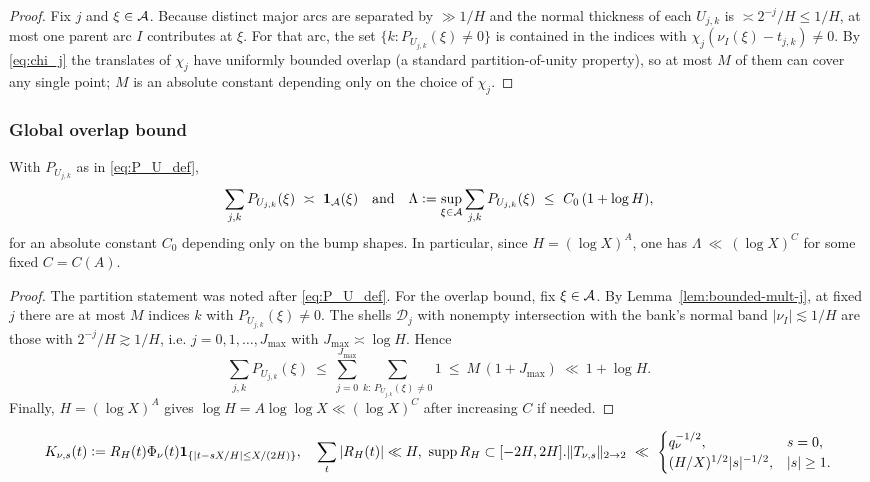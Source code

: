 \begin{proof}
Fix $j$ and $\xi\in\mathcal{A}$. Because distinct major arcs are separated by $\gg 1/H$ and the normal thickness of each $U_{j,k}$ is $\asymp 2^{-j}/H\le 1/H$, at most one parent arc $I$ contributes at $\xi$.
For that arc, the set $\{k: P_{U_{j,k}}(\xi)\neq 0\}$ is contained in the indices with $\chi_j(\nu_I(\xi)-t_{j,k})\neq 0$.
By \eqref{eq:chi_j} the translates of $\chi_j$ have uniformly bounded overlap (a standard partition-of-unity property),
so at most $M$ of them can cover any single point; $M$ is an absolute constant depending only on the choice of $\chi_j$.
\end{proof}

\subsubsection{Global overlap bound}
\begin{proposition}\label{prop:tube-overlap}
With $P_{U_{j,k}}$ as in \eqref{eq:P_U_def},
\[
\sum_{j,k} P_{U_{j,k}}(\xi)\ \asymp\ \mathbf 1_{\mathcal{A}}(\xi)
\quad\text{and}\quad
\Lambda:=\sup_{\xi\in\mathcal{A}}\sum_{j,k} P_{U_{j,k}}(\xi)\ \le\ C_0\,(1+\log H),
\]
for an absolute constant $C_0$ depending only on the bump shapes.
In particular, since $H=(\log X)^A$, one has $\Lambda\ \ll\ (\log X)^C$ for some fixed $C=C(A)$.
\end{proposition}

\begin{proof}
The partition statement was noted after \eqref{eq:P_U_def}. For the overlap bound, fix $\xi\in\mathcal{A}$.
By Lemma~\ref{lem:bounded-mult-j}, at fixed $j$ there are at most $M$ indices $k$ with $P_{U_{j,k}}(\xi)\neq 0$.
The shells $\mathcal D_j$ with nonempty intersection with the bank’s normal band $|\nu_I|\lesssim 1/H$ are those with
$2^{-j}/H\gtrsim 1/H$, i.e. $j=0,1,\dots,J_{\max}$ with $J_{\max}\asymp \log H$.
Hence
\[
\sum_{j,k} P_{U_{j,k}}(\xi)\ \le\ \sum_{j=0}^{J_{\max}} \sum_{k:\,P_{U_{j,k}}(\xi)\neq 0} 1\ \le\ M\,(1+J_{\max})
\ \ll\ 1+\log H.
\]
Finally, $H=(\log X)^A$ gives $\log H = A\log\log X \ll (\log X)^C$ after increasing $C$ if needed.
\end{proof}

\begin{proposition}\label{prop:packet}
\[K_{\nu,s}(t):=R_H(t)\Phi_\nu(t)\mathbf 1_{\{|t-sX/H|\le X/(2H)\}},
\allowbreak
\quad 
\sum_t|R_H(t)|\ll H,\ \supp R_H\subset[-2H,2H].
\\
\|T_{\nu,s}\|_{2\to2}\ \ll\ 
\begin{cases}
q_\nu^{-1/2}, & s=0,\\
(H/X)^{1/2}|s|^{-1/2}, & |s|\ge1.
\end{cases}\]
\end{proposition}

